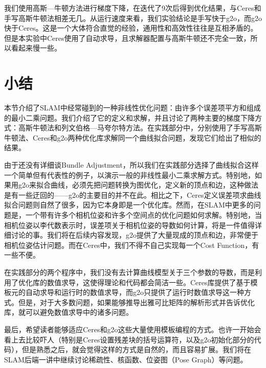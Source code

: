 我们使用高斯—牛顿方法进行梯度下降，在迭代了9次后得到优化结果，与Ceres和手写高斯牛顿法相差无几。从运行速度来看，我们实验结论是手写快于g2o，而g2o快于Ceres。这是一个大体符合直觉的经验，通用性和高效性往往是互相矛盾的。但是本实验中Ceres使用了自动求导，且求解器配置与高斯牛顿还不完全一致，所以看起来慢一些。

\section{小结}
本节介绍了SLAM中经常碰到的一种非线性优化问题：由许多个误差项平方和组成的最小二乘问题。我们介绍了它的定义和求解，并且讨论了两种主要的梯度下降方式：高斯牛顿法和列文伯格—马夸尔特方法。在实践部分中，分别使用了手写高斯牛顿法、Ceres和g2o两种优化库求解同一个曲线拟合问题，发现它们给出了相似的结果。

由于还没有详细谈Bundle Adjustment，所以我们在实践部分选择了曲线拟合这样一个简单但有代表性的例子，以演示一般的非线性最小二乘求解方式。特别地，如果用g2o来拟合曲线，必须先把问题转换为图优化，定义新的顶点和边，这种做法是有一些迂回的——g2o的主要目的并不在此。相比之下，Ceres定义误差项求曲线拟合问题则自然了很多，因为它本身即是一个优化库。然而，在SLAM中更多的问题是，一个带有许多个相机位姿和许多个空间点的优化问题如何求解。特别地，当相机位姿以李代数表示时，误差项关于相机位姿的导数如何计算，将是一件值得详细讨论的事。我们将在后续内容发现，g2o提供了大量现成的顶点和边，非常便于相机位姿估计问题。而在Ceres中，我们不得不自己实现每一个Cost Function，有一些不便。

在实践部分的两个程序中，我们没有去计算曲线模型关于三个参数的导数，而是利用了优化库的数值求导，这使得理论和代码都会简洁一些。Ceres库提供了基于模板元的自动求导和运行时的数值求导，而g2o只提供了运行时数值求导这一种方式。但是，对于大多数问题，如果能够推导出雅可比矩阵的解析形式并告诉优化库，就可以避免数值求导中的诸多问题。

最后，希望读者能够适应Ceres和g2o这些大量使用模板编程的方式。也许一开始会看上去比较吓人（特别是Ceres设置残差块的括号运算符，以及g2o初始化部分的代码），但是熟悉之后，就会觉得这样的方式是自然的，而且容易扩展。我们将在SLAM后端一讲中继续讨论稀疏性、核函数、位姿图（Pose Graph）等问题。


